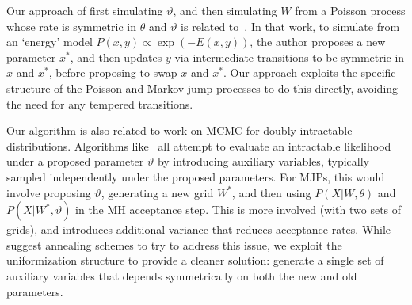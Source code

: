 %
Our approach of first simulating $\vartheta$, and then simulating $W$ from a Poisson process whose rate is symmetric in $\theta$ and $\vartheta$ is related to~\citet{Neal04Drag}. In that work, to simulate from an `energy' model $P(x,y) \propto \exp(-E(x,y))$, the author proposes a new parameter $x^*$, and then updates $y$ via intermediate transitions to be symmetric in $x$ and $x^*$, before proposing to swap $x$ and $x^*$. Our approach exploits the specific structure of the Poisson and Markov jump processes to do this directly, avoiding the need for any tempered transitions. 

Our algorithm is also related to work on MCMC for doubly-intractable distributions.  Algorithms like~\cite{Moller2006,murray2006,Andrieu09} all attempt to evaluate an intractable likelihood under a proposed parameter $\vartheta$ by introducing auxiliary variables, typically sampled independently under the proposed parameters. 
For MJPs, this would involve proposing $\vartheta$, generating a new grid $W^*$, and then using $P(X|W,\theta)$ and $P(X|W^*,\vartheta)$ in the MH acceptance step. 
This is more involved (with two sets of grids), and introduces additional variance that reduces acceptance rates. %
While~\cite{murray2006} suggest annealing schemes to try to address this issue, we exploit the uniformization structure to provide a cleaner solution: generate a single set of auxiliary variables that depends symmetrically on both the new and old parameters. 
